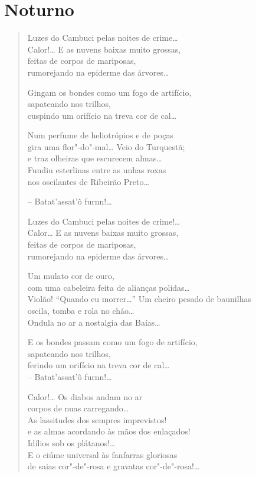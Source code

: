 \chapter{Noturno}

\begin{verse}
Luzes do Cambuci pelas noites de crime\ldots{}\\
Calor!\ldots{} E as nuvens baixas muito grossas,\\
feitas de corpos de mariposas,\\
rumorejando na epiderme das árvores\ldots{}

Gingam os bondes como um fogo de artifício,\\
sapateando nos trilhos,\\
cuspindo um orifício na treva cor de cal\ldots{}

Num perfume de heliotrópios e de poças\\
gira uma flor"-do"-mal\ldots{} Veio do Turquestã;\\
e traz olheiras que escurecem almas\ldots{}\\
Fundiu esterlinas entre as unhas roxas\\
nos oscilantes de Ribeirão Preto\ldots{}

-- Batat'assat'ô furnn!\ldots{}

Luzes do Cambuci pelas noites de crime!\ldots{}\\
Calor\ldots{} E as nuvens baixas muito grossas,\\
feitas de corpos de mariposas,\\
rumorejando na epiderme das árvores\ldots{}

Um mulato cor de ouro,\\
com uma cabeleira feita de alianças polidas\ldots{}\\
Violão! ``Quando eu morrer\ldots{}'' Um cheiro pesado de baunilhas\\
oscila, tomba e rola no chão\ldots{}\\
Ondula no ar a nostalgia das Baías\ldots{}

E os bondes passam como um fogo de artifício,\\
sapateando nos trilhos,\\
ferindo um orifício na treva cor de cal\ldots{}\\

-- Batat'assat'ô furnn!\ldots{}

Calor!\ldots{} Os diabos andam no ar\\
corpos de nuas carregando\ldots{}\\
As lassitudes dos sempres imprevistos!\\
e as almas acordando às mãos dos enlaçados!\\
Idílios sob os plátanos!\ldots{}\\
E o ciúme universal às fanfarras gloriosas\\
de saias cor"-de"-rosa e gravatas cor"-de"-rosa!\ldots{}


\end{verse}
